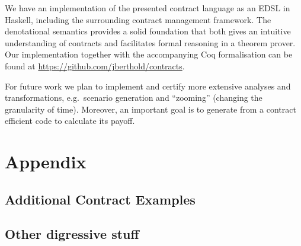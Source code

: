 \documentclass[a4paper,debug,twocolumn]{easychair}
\newcommand{\comm}[3][red]{{\small \color{#1}{$\spadesuit$#2: #3}}}
\newcommand{\jbcomment}[1]{\comm[orange]{jb}{#1}}
\theoremstyle{plain}
\begin{document}
We have an implementation of the presented contract language as an
EDSL in Haskell, including the surrounding contract management
framework. The denotational semantics provides a solid foundation that
both gives an intuitive understanding of contracts and facilitates
formal reasoning in a theorem prover. Our implementation together with
the accompanying Coq formalisation can be found at
\url{https://github.com/jberthold/contracts}.

For future work we plan to implement and certify more extensive
analyses and transformations, e.g.\ scenario generation and
``zooming'' (changing the granularity of time). Moreover, an important
goal is to generate from a contract efficient code to calculate its
payoff.





\newpage
\appendix

\section*{Appendix}
\subsection*{Additional Contract Examples}
\jbcomment{Something from the FX portfolio, plus some asian option and the Lexifi barrier product (both use acc)}

\subsection*{Other digressive stuff}
\jbcomment{what else goes here? otherwise drop it}
\end{document}
